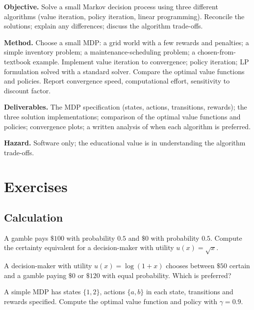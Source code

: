 \begin{project}
\textbf{Objective.} Solve a small Markov decision process using three different algorithms (value iteration, policy iteration, linear programming). Reconcile the solutions; explain any differences; discuss the algorithm trade-offs.

\textbf{Method.} Choose a small MDP: a grid world with a few rewards and penalties; a simple inventory problem; a maintenance-scheduling problem; a chosen-from-textbook example. Implement value iteration to convergence; policy iteration; LP formulation solved with a standard solver. Compare the optimal value functions and policies. Report convergence speed, computational effort, sensitivity to discount factor.

\textbf{Deliverables.} The MDP specification (states, actions, transitions, rewards); the three solution implementations; comparison of the optimal value functions and policies; convergence plots; a written analysis of when each algorithm is preferred.

\textbf{Hazard.} Software only; the educational value is in understanding the algorithm trade-offs.
\end{project}

\section{Exercises}

\subsection*{Calculation}

\begin{exercise}
A gamble pays $\$100$ with probability $0.5$ and $\$0$ with probability $0.5$. Compute the certainty equivalent for a decision-maker with utility $u(x) = \sqrt{x}$.
\end{exercise}

\begin{exercise}
A decision-maker with utility $u(x) = \log(1 + x)$ chooses between $\$50$ certain and a gamble paying $\$0$ or $\$120$ with equal probability. Which is preferred?
\end{exercise}

\begin{exercise}
A simple MDP has states $\{1, 2\}$, actions $\{a, b\}$ in each state, transitions and rewards specified. Compute the optimal value function and policy with $\gamma = 0.9$.
\end{exercise}

